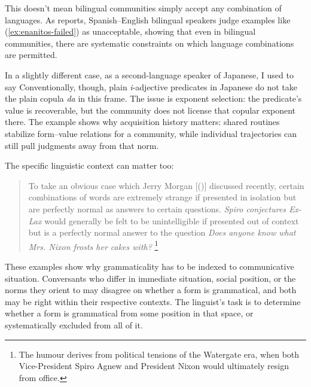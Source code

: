\documentclass[12pt,letterpaper]{article}
\newcommand{\mention}[1]{\textit{#1}}
\begin{document}
This doesn't mean bilingual communities simply accept any combination of languages. As \textcite{Toribio2001} reports, Spanish--English bilingual speakers judge examples like (\ref{ex:enanitos-failed}) as unacceptable, showing that even in bilingual communities, there are systematic constraints on which language combinations are permitted.

\label{ex:enanitos-failed}
\z

In a slightly different case, as a second-language speaker of Japanese, I used to say
\z
Conventionally, though, plain \textit{i}-adjective predicates in Japanese do not take the plain copula \mention{da} in this frame. The issue is exponent selection: the predicate's value is recoverable, but the community does not license that copular exponent there. The example shows why acquisition history matters: shared routines stabilize form--value relations for a community, while individual trajectories can still pull judgments away from that norm.

The specific linguistic context can matter too:
\begin{quote}
To take an obvious case which Jerry Morgan [(\citeyear{morgan1973})] discussed recently, certain combinations of words are extremely strange if presented in isolation but are perfectly normal as answers to certain questions. \textit{Spiro conjectures Ex-Lax} would generally be felt to be unintelligible if presented out of context but is a perfectly normal answer to the question \textit{Does anyone know what Mrs. Nixon frosts her cakes with?} \autocite[252, italics added]{McCawley1974}\footnote{The humour derives from political tensions of the Watergate era, when both Vice-President Spiro Agnew and President Nixon would ultimately resign from office.}
\end{quote}

These examples show why grammaticality has to be indexed to communicative situation. Conversants who differ in immediate situation, social position, or the norms they orient to may disagree on whether a form is grammatical, and both may be right within their respective contexts. The linguist's task is to determine whether a form is grammatical from some position in that space, or systematically excluded from all of it.
\end{document}

